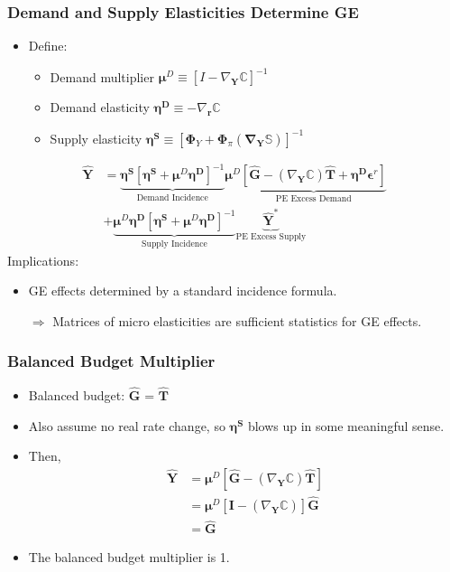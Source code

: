 \documentclass[english,xcolor=svgnames]{beamer}
\begin{document}
\begin{frame}
    \frametitle{Demand and Supply Elasticities Determine GE}
    \begin{itemize}
        \item Define:
        \begin{itemize}
            \item Demand multiplier $\bm{\mu}^D \equiv [I - \nabla_{\bm{Y}}\pmb{\mathbb{C}}]^{-1}$
            \item Demand elasticity $\bm{\eta^D} \equiv -\nabla_{\bm{r}}\pmb{\mathbb{C}}$
            \item Supply elasticity $\bm{\eta^S} \equiv [ \bm{\Phi}_Y  +  \bm{\Phi}_\pi (\pmb{\nabla_{\bm{Y}}\pmb{\mathbb{S}}}) ]^{-1}$
        \end{itemize}
    \end{itemize}
    \begin{align*}
        \bm{\hat{Y}} &=  \underbrace{\bm{\eta^S} [ \bm{\eta^S} + \bm{\mu}^D\bm{\eta^D}  ]^{-1}}_{\text{Demand Incidence}}  \bm{\mu}^D  \underbrace{[\bm{\hat{G}} - (\nabla_{\bm{Y}}\pmb{\mathbb{C}})\bm{\hat{T}} + \bm{\eta^D}\bm{\epsilon}^r ]}_{\text{PE Excess Demand}}  \\
        & + \underbrace{\bm{\mu}^D\bm{\eta^D} [ \bm{\eta^S} + \bm{\mu}^D\bm{\eta^D}  ]^{-1}  }_{\text{Supply Incidence}}   \underbrace{\bm{\hat{Y}}^*}_{\text{PE Excess Supply}}  
    \end{align*}
    Implications:
    \begin{itemize}
        \item GE effects determined by a standard incidence formula.  
        \item[$\Rightarrow$] Matrices of micro elasticities are sufficient statistics for GE effects. 
    \end{itemize}
\end{frame}


\begin{frame}
    \frametitle{Balanced Budget Multiplier}
    \begin{itemize}
        \item Balanced budget: $\bm{\hat{G}}$ = $\bm{\hat{T}}$
        \item Also assume no real rate change, so $\bm{\eta^S}$ blows up in some meaningful sense.
        \item Then,
         \begin{align*}
        \bm{\hat{Y}} &=    \bm{\mu}^D  [\bm{\hat{G}} - (\nabla_{\bm{Y}}\pmb{\mathbb{C}})\bm{\hat{T}}] \\
                & = \bm{\mu}^D  [\bm{I} - (\nabla_{\bm{Y}}\pmb{\mathbb{C}})]\bm{\hat{G}}  \\
                &= \bm{\hat{G}}
    \end{align*}
    \item The balanced budget multiplier is 1.
    \end{itemize}
\end{frame}
\end{document}
